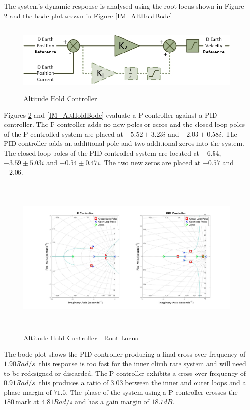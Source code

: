 \documentclass[12pt]{report}
\begin{document}
	The system's dynamic response is analysed using the root locus shown in Figure \ref{IM_AltHoldRoot} and the bode plot shown in Figure \ref{IM_AltHoldBode}.
	
	\begin{figure}[H]
		\centering
		\includegraphics[height = 3.5cm]{../References/Diagrams/AltHoldController.jpg}
		\caption{Altitude Hold Controller}
		\label{IM_AltHoldController}
	\end{figure}
	
	Figures \ref{IM_AltHoldRoot} and \ref{IM_AltHoldBode} evaluate a P controller against a PID controller. The P controller adds no new poles or zeros and the closed loop poles of the P controlled system are placed at $-5.52 \pm 3.23i$ and $-2.03 \pm 0.58i$. 
	The PID controller adds an additional pole and two additional zeros into the system. The closed loop poles of the PID controlled system are located at $-6.64$, $-3.59 \pm 5.03i$ and $-0.64 \pm 0.47i$. The two new zeros are placed at $-0.57$ and $-2.06$.
	
	\begin{figure}[H]
		\centering
		\includegraphics[height = 8cm]{../Design/Matlab/Controllers/altitude_root.jpg}
		\caption{Altitude Hold Controller -  Root Locus}
		\label{IM_AltHoldRoot}
	\end{figure}
	
	The bode plot shows the PID controller producing a final cross over frequency of $1.90Rad/s$, this response is too fast for the inner climb rate system and will need to be redesigned or discarded. The P controller exhibits a cross over frequency of $0.91Rad/s$, this produces a ratio of $3.03$ between the inner and outer loops and a phase margin of $71.5$\textdegree. The phase of the system using a P controller crosses the $180$\textdegree  $\ $mark at $4.81Rad/s$ and has a gain margin of $18.7dB$.
	
\end{document}

